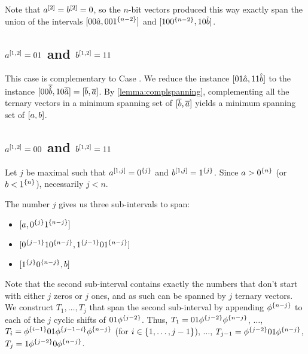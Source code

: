 Note that $a^{[2]} = b^{[2]} = 0$,
so the $n$-bit vectors produced this way
exactly span the union of the intervals
$[00 \hat{a}, 00 1^{\{n-2\}}]$
and $[10 0^{\{n-2\}}, 10 \hat{b}]$.

\subsection{\texorpdfstring
{$a^{[1, 2]} = 01$ and $b^{[1, 2]} = 11$}
{ = 01 and  = 11}
}

This case is complementary to Case .
We reduce the instance $[01 \hat{a}, 11 \hat{b}]$
to the instance
$[00 \overline{\hat{b}}, 10\overline{\hat{a}}]
= [\overline{b}, \overline{a}]$.
By \cref{lemma:complspanning},
complementing all the ternary vectors
in a minimum spanning set
of $[\overline{b}, \overline{a}]$
yields a minimum spanning set of $[a, b]$.

\subsection{\texorpdfstring
{$a^{[1, 2]} = 00$ and $b^{[1, 2]} = 11$}
{ = 00 and  = 11}
}
\label{sec:1interval0011}

Let $j$ be maximal such that
$a^{[1, j]} = 0^{\{j\}}$ and
$b^{[1, j]} = 1^{\{j\}}$.
Since $a > 0^{\{n\}}$ (or $b < 1^{\{n\}}$),
necessarily $j < n$.

The number $j$ gives us three sub-intervals to span:

\begin{itemize}
\item $[a, 0^{\{j\}} 1^{\{n-j\}}]$
\item $[0^{\{j-1\}} 1 0^{\{n-j\}}, 1^{\{j-1\}} 0 1^{\{n-j\}}]$
\item $[1^{\{j\}} 0^{\{n-j\}}, b]$
\end{itemize}

Note that the second sub-interval contains exactly
the numbers that don't start with either $j$ zeros
or $j$ ones,
and as such can be spanned by $j$ ternary vectors.
We construct $T_1, \ldots, T_j$ that span
the second sub-interval
by appending $\phi^{\{n-j\}}$
to each of the $j$ cyclic shifts of $01 \phi^{\{j-2\}}$.
Thus,
$T_1 = 01 \phi^{\{j-2\}} \phi^{\{n-j\}}$,
$\ldots$,
$T_i = \phi^{\{i-1\}} 01 \phi^{\{j-1-i\}} \phi^{\{n-j\}}$
(for $i \in \{1, \ldots, j-1\}$),
$\ldots$,
$T_{j-1} = \phi^{\{j-2\}} 01 \phi^{\{n-j\}}$,
$T_j = 1 \phi^{\{j-2\}} 0 \phi^{\{n-j\}}$.

